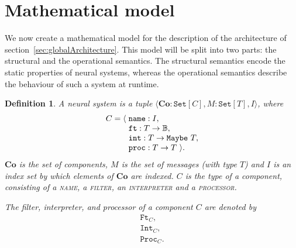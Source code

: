 \documentclass[]{scrartcl}
\newtheorem{definition}{Definition}
\renewcommand{\tt}[1]{\texttt{#1}}
\newcommand{\caps}[1]{\textsc{#1}}
\newcommand{\ft}[1]{\tt{Ft}_{#1}}
\renewcommand{\int}[1]{\tt{Int}_{#1}}
\newcommand{\proc}[1]{\tt{Proc}_{#1}}
\begin{document}

\section{Mathematical model}\label{sec:mathematicalModel}

We now create a mathematical model for the description of the architecture of section~\ref{sec:globalArchitecture}. This model will be split into two parts: the structural and the operational semantics. The structural semantics encode the static properties of neural systems, whereas the operational semantics describe the behaviour of such a system at runtime.

\begin{definition}
A neural system is a tuple $\langle \mathbf{Co} : \tt{Set}[C], M : \tt{Set}[T], I \rangle$, where $$
\begin{array}{l@{\hspace{0.3em}}l}
C = \langle & \tt{name} : I,\\
            & \tt{ft} : T \rightarrow \mathbb{B},\\
            & \tt{int} : T \rightarrow \tt{Maybe}\ T,\\
            & \tt{proc} : T \rightarrow T \ \rangle.
\end{array}$$
$\mathbf{Co}$ is the set of components, $M$ is the set of messages (with type $T$) and $I$ is an index set  by which elements of $\mathbf{Co}$ are indexed. $C$ is the type of a component, consisting of a \caps{name}, a \caps{filter}, an \caps{interpreter} and a \caps{processor}.

The filter, interpreter, and processor of a component $C$ are denoted by
$$
	\begin{array}{l}
		\ft{C},\\
		\int{C},\\
		\proc{C}.
	\end{array}
$$

\end{definition}
\end{document}
